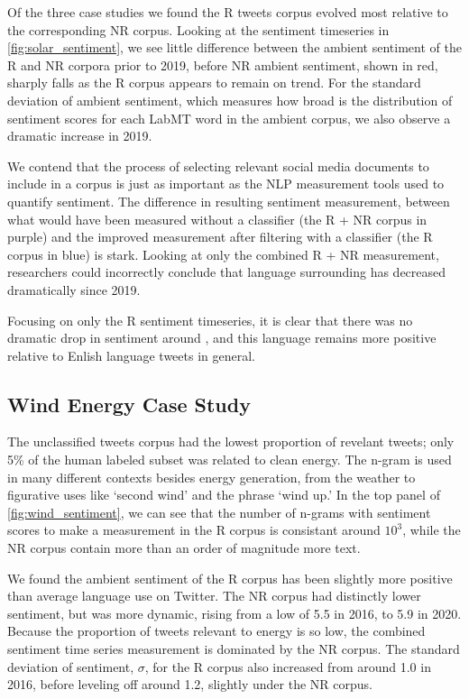 Of the three case studies 
we found the R  tweets corpus evolved
most relative to the corresponding NR corpus.
Looking at the sentiment timeseries in \ref{fig:solar_sentiment}, 
we see little difference between the ambient sentiment of the R and NR corpora prior to 2019,
before NR ambient sentiment, shown in red, sharply falls as the R corpus appears to remain on trend.
For the standard deviation of ambient sentiment, 
which measures how broad is the distribution of sentiment scores for each LabMT word in the ambient corpus,
we also observe a dramatic increase in 2019.

We contend that the process of selecting relevant social media documents to include in a corpus
is just as important as the NLP measurement tools
used to quantify sentiment.
The difference in resulting sentiment measurement,
between what would have been measured without a classifier
(the R + NR corpus in purple) 
and the improved measurement after filtering with a classifier 
(the R corpus in blue) 
is stark. 
Looking at only the combined R + NR measurement,
researchers could incorrectly conclude that language surrounding  has decreased dramatically since 2019. 

Focusing on only the R  sentiment timeseries, it is clear that there was no dramatic drop in sentiment around , and this language remains more positive relative to Enlish language tweets in general.




\subsection{Wind Energy Case Study}
\todo{}
The unclassified  tweets corpus had the lowest proportion of revelant tweets;
only 5\% of the human labeled subset was related to clean energy.
The n-gram  is used in many different contexts besides energy generation,
from the weather to figurative uses like `second wind' and the phrase `wind up.' In the top panel of \ref{fig:wind_sentiment}, we can see that the number of n-grams with sentiment scores to make a measurement in the R corpus is consistant around $10^3$, while the NR corpus contain more than an order of magnitude more text.

We found the ambient sentiment of the R  corpus has been slightly more positive than average language use on Twitter. 
The NR corpus had distinctly lower sentiment, but was more dynamic, rising from a low of 5.5 in 2016, to 5.9 in 2020.
Because the proportion of tweets relevant to energy is so low, 
the combined sentiment time series measurement is dominated by the NR corpus. 
The standard deviation of sentiment, $\sigma$, for the R corpus also increased from around 1.0 in 2016, before leveling off around 1.2, slightly under the NR corpus.

